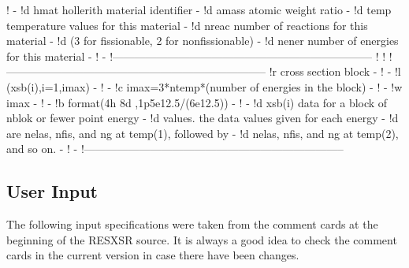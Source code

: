 \begin{ccode}
!                                                                      -
!d    hmat        hollerith material identifier                        -
!d    amass       atomic weight ratio                                  -
!d    temp        temperature values for this material                 -
!d    nreac       number of reactions for this material                -
!d                  (3 for fissionable, 2 for nonfissionable)          -
!d    nener       number of energies for this material                 -
!                                                                      -
!-----------------------------------------------------------------------
!
!
!-----------------------------------------------------------------------
!r          cross section block                                        -
!                                                                      -
!l    (xsb(i),i=1,imax)                                                -
!                                                                      -
!c    imax=3*ntemp*(number of energies in the block)                   -
!                                                                      -
!w    imax                                                             -
!                                                                      -
!b    format(4h 8d ,1p5e12.5/(6e12.5))                                 -
!                                                                      -
!d    xsb(i)      data for a block of nblok or fewer point energy      -
!d                values.  the data values given for each energy       -
!d                are nelas, nfis, and ng at temp(1), followed by      -
!d                nelas, nfis, and ng at temp(2), and so on.           -
!                                                                      -
!-----------------------------------------------------------------------

\end{ccode}
\normalsize

\subsection{User Input}
\label{ssRESXSR_inp}

The following input specifications were taken from the comment cards
at the beginning of the RESXSR source.  It is always a good idea to
check the comment cards in the current version in case there have
been changes.

